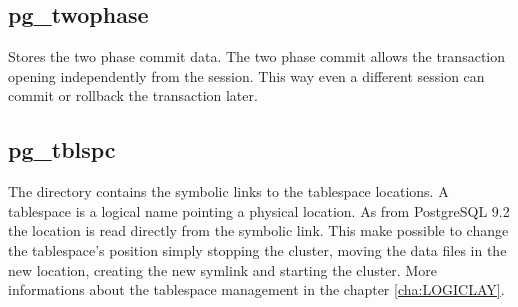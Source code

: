 \subsection{pg\_twophase}
Stores the two phase commit data. The two phase commit allows the transaction 
opening independently from the session. This way even a different session can 
commit or rollback the transaction later.

\subsection{pg\_tblspc}
\label{sub:TABLESPACE}
The directory contains the symbolic links to the tablespace locations.
A tablespace is a logical name pointing a physical location. As from PostgreSQL 
9.2 the location is read directly from the symbolic link. This make possible 
to change the tablespace's position simply stopping the cluster, moving the 
data files in the new location, creating the new symlink and starting the 
cluster.
More informations about the tablespace management in the 
chapter \ref{cha:LOGICLAY}. 


